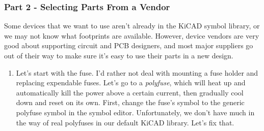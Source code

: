 \documentclass[
  letterpaper,
  DIV=11,
  numbers=noendperiod,
  oneside]{scrartcl}
\begin{document}
\subsubsection{Part 2 - Selecting Parts From a
Vendor}\label{part-2---selecting-parts-from-a-vendor}

Some devices that we want to use aren't already in the KiCAD symbol
library, or we may not know what footprints are available. However,
device vendors are very good about supporting circuit and PCB designers,
and most major suppliers go out of their way to make sure it's easy to
use their parts in a new design.

\begin{enumerate}
\def\labelenumi{\arabic{enumi}.}
\item
  Let's start with the fuse. I'd rather not deal with mounting a fuse
  holder and replacing expendable fuses. Let's go to a \emph{polyfuse},
  which will heat up and automatically kill the power above a certain
  current, then gradually cool down and reset on its own. First, change
  the fuse's symbol to the generic polyfuse symbol in the symbol editor.
  Unfortunately, we don't have much in the way of real polyfuses in our
  default KiCAD library. Let's fix that.


\end{enumerate}
\end{document}
